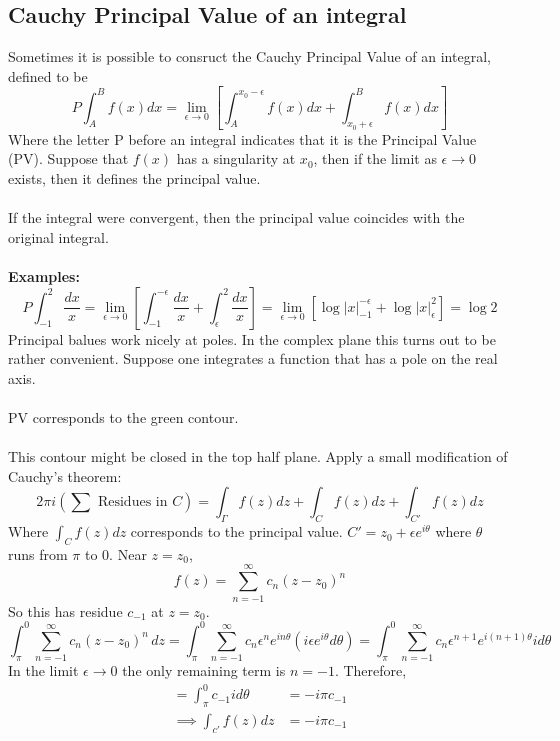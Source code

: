 \documentclass{article}
\newcommand{\examples}{\textbf{Examples:}}
\begin{document}
\subsection*{Cauchy Principal Value of an integral}
Sometimes it is possible to consruct the Cauchy Principal Value of an integral,
defined to be
\[ P \int_A^B f(x) dx = \lim_{\epsilon \to 0} \left[ \int^{x_0 - \epsilon}_A 
f(x) dx + \int^B_{x_0 + \epsilon} f(x) dx \right] \]
Where the letter P before an integral indicates that it is the Principal Value
(PV). Suppose that $f(x)$ has a singularity at $x_0$, then if the limit as
$\epsilon \to 0$ exists, then it defines the principal value.
\\
\\
If the integral were convergent, then the principal value coincides with the
original integral.
\\
\\
\examples\
\[ P\int_{-1}^2 \frac{dx}{x} = \lim_{\epsilon \to 0} \left[ \int_{-1}^{-\epsilon}
\frac{dx}{x} + \int^2_{\epsilon} \frac{dx}{x} \right] = 
 \lim_{\epsilon \to 0} \left[ 
\log |x| ^{-\epsilon}_{-1} + \log |x| ^2 _{\epsilon} \right] = \log 2 \]
Principal balues work nicely at poles. In the complex plane this turns out to be
rather convenient. Suppose one integrates a function that has a pole on the real 
axis.
\\
\\
PV corresponds to the green contour.
\\
\\
This contour might be closed in the top half plane. Apply a small modification
of Cauchy's theorem:
\[ 2\pi i \left( \sum \mbox{ Residues in } C \right) = \int_{\Gamma} f(z) dz
+ \int_C f(z) dz + \int_{C'} f(z) dz \]
Where $\displaystyle \int_C f(z) dz$ corresponds to the principal value.
$C' = z_0 + \epsilon e^{i \theta} $ where $\theta$ runs from $\pi$ to $0$.
Near $z = z_0$,
\[f(z) = \sum_{n=-1}^{\infty} c_n ( z-z_0)^n \]
So this has residue $c_{-1}$ at $z = z_0$.
\[ \int_{\pi}^0 \sum_{n=-1}^{\infty} c_n ( z-z_0)^n  \, dz 
= \int_{\pi}^0 \sum_{n=-1}^{\infty} c_n \epsilon^n e^{in\theta} 
(i \epsilon e^{i\theta} d\theta) 
= \int_{\pi}^0 \sum_{n=-1}^{\infty} c_n \epsilon^{n+1} e^{i(n+1)\theta} 
i d\theta \]
In the limit $\epsilon \to 0$ the only remaining term is $n=-1$.
Therefore,
\begin{align*}
 = \int_{\pi}^0 c_{-1} i d\theta &= -i\pi c_{-1} \\
 \implies \int_{c'} f(z) dz &= -i\pi c_{-1} 
\end{align*}
\end{document}
